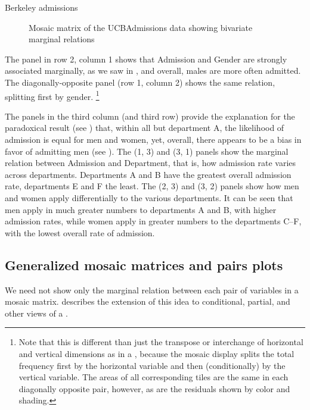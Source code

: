 \documentclass[10pt,krantz2]{krantz}\usepackage[]{graphicx}\usepackage[]{color}
\newenvironment{knitrout}{}{} %
\renewenvironment{knitrout}{\small\renewcommand{\baselinestretch}{.85}}{} %
\begin{document}
\begin{Example}[berkeley4]{Berkeley admissions}
\begin{knitrout}
\begin{figure}[!htb]
\caption[Mosaic matrix of the UCBAdmissions data showing bivariate marginal relations]{Mosaic matrix of the UCBAdmissions data showing bivariate marginal relations\label{fig:berk-pairs1}}
\end{figure}


\end{knitrout}
The panel in row 2, column 1
shows that Admission and Gender are
strongly associated marginally, as we saw in ,
and overall, males are more often admitted.
The diagonally-opposite panel (row 1, column 2) shows the
same relation, splitting first by gender.%
\footnote{Note that this is different than just the transpose or interchange
of horizontal and vertical dimensions as in a \scatmat,
because the mosaic display splits the total frequency first by the horizontal
variable and then (conditionally) by the vertical variable.
The areas of all corresponding tiles are the same in each diagonally
opposite pair, however, as are the
residuals shown by color and shading.}

The panels in the third column (and third row)
provide the explanation for the paradoxical
result (see ) that, within all but department A,
the likelihood of admission is equal for men and women,
yet, overall, there appears to be a bias in favor of admitting men
(see ).
The (1, 3) and (3, 1) panels show
the marginal relation between Admission and Department, that is,
how admission rate varies across departments.
Departments A and B have the greatest
overall admission rate, departments E and F the least.
The (2, 3) and (3, 2)
panels show how men and women apply differentially to
the various departments.
It can be seen that
men apply in much greater numbers to
departments A and B, with higher admission rates,
while women apply in greater numbers to
the departments C--F, with the lowest overall rate of admission.

\end{Example}

\subsection{Generalized mosaic matrices and pairs plots}\label{sec:condmat}

We need not show only the marginal relation between
each pair of variables in a mosaic matrix.
\citep{Friendly:99:EMD} describes the extension of this idea
to conditional, partial, and other views of a \ctab.
\end{document}
